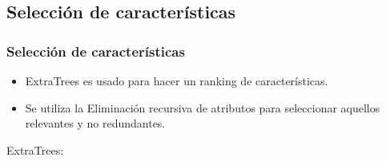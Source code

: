 \subsection{Selección de características}
\begin{frame}[allowframebreaks]
    \frametitle{Selección de características}

    \begin{itemize}
        \item ExtraTrees es usado para hacer un ranking de características.
        \item Se utiliza la Eliminación recursiva de atributos para seleccionar aquellos relevantes y no redundantes.
    \end{itemize}

    \framebreak

    ExtraTrees:


\end{frame}
